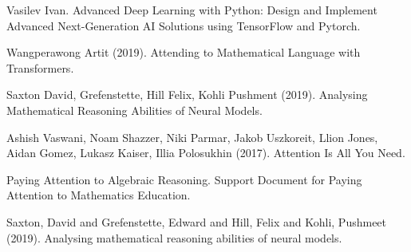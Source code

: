 \documentclass[conference]{IEEEtran}
\begin{document}
\begin{thebibliography}{00}

 Vasilev Ivan. Advanced Deep Learning with Python:  Design and Implement Advanced Next-Generation AI Solutions using TensorFlow and Pytorch.

 Wangperawong Artit (2019). Attending to Mathematical Language with Transformers.

 Saxton David, Grefenstette, Hill Felix, Kohli Pushment (2019). Analysing Mathematical Reasoning Abilities of Neural Models.

 Ashish Vaswani, Noam Shazzer, Niki Parmar, Jakob Uszkoreit, Llion Jones, Aidan Gomez, Lukasz Kaiser, Illia Polosukhin (2017). Attention Is All You Need.

 Paying Attention to Algebraic Reasoning. Support Document for Paying Attention to Mathematics Education.


Saxton, David and Grefenstette, Edward and Hill, Felix and Kohli, Pushmeet (2019). Analysing mathematical reasoning abilities of neural models.

\end{thebibliography}
\end{document}
